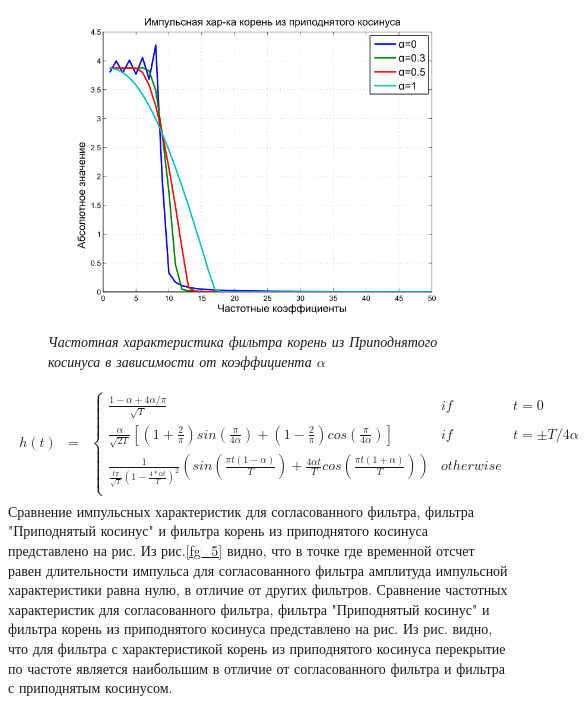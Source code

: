 \begin{figure}[H]
\centering
\includegraphics[width=0.9\columnwidth]{RRC_freq.png}
\caption{\textit{Частотная характеристика фильтра корень из Приподнятого косинуса в зависимости от коэффициента $\alpha$}} \label{fg_4}
\end{figure}
\begin{align}
\begin{matrix}
h(t) &=& \left\{ \begin{matrix} 
\frac{1-\alpha +4\alpha/\pi}{\sqrt{T}}& if& t=0\\
\frac{\alpha}{\sqrt{2T}}[(1+\frac{2}{\pi})sin(\frac{\pi}{4\alpha})+(1-\frac{2}{\pi})cos(\frac{\pi}{4\alpha})] & if &t= \pm T/4\alpha\\
\frac{1}{\frac{t\pi}{\sqrt{T}}(1-\frac{4*\alpha t}{T})^2}(sin(\frac{\pi t (1-\alpha)}{T})+\frac{4\alpha t}{T} cos(\frac{\pi t (1+ \alpha)}{T}) ) &otherwise \\
\end{matrix} \right.
\end{matrix}
\label{g_2}
\end{align}
Сравнение импульсных характеристик для согласованного фильтра, фильтра "Приподнятый косинус" и фильтра корень из приподнятого косинуса представлено на рис. Из рис.\eqref{fg_5} видно, что в точке где временной отсчет равен длительности импульса для согласованного фильтра амплитуда импульсной характеристики равна нулю, в отличие от других фильтров. Сравнение частотных характеристик для согласованного фильтра, фильтра "Приподнятый косинус" и фильтра корень из приподнятого косинуса представлено на рис. Из рис. видно, что для фильтра с характеристикой корень из приподнятого косинуса перекрытие по частоте является наибольшим в отличие от согласованного фильтра и фильтра с приподнятым косинусом.
